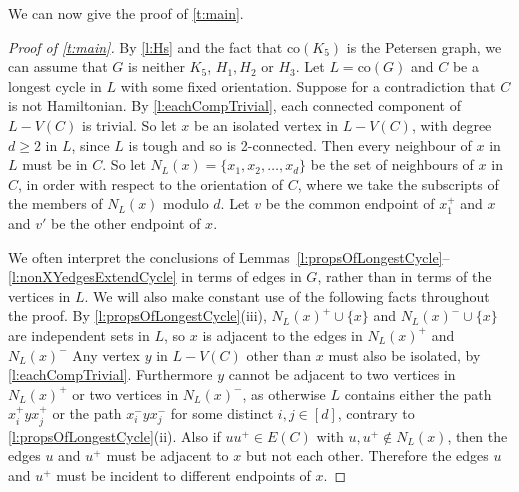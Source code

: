 \documentclass[12pt]{article}
\theoremstyle{definition}
\newcommand{\co}{\text{co}}
\begin{document}
\noindent We can now give the proof of \cref{t:main}.
\begin{proof}[Proof of \cref{t:main}]
By \cref{l:Hs} and the fact that $\co(K_5)$ is the Petersen graph, we can assume that $G$ is neither $K_5$, $H_1,H_2$ or $H_3$.
Let $L = \co(G)$ and  $C$ be a longest cycle in $L$ with some fixed orientation. Suppose for a contradiction that $C$ is not Hamiltonian.
By \cref{l:eachCompTrivial}, each connected component of $L-V(C)$ is trivial. 
So let $x$ be an isolated vertex in $L-V(C)$, with degree $d \geq 2$ in $L$, since $L$ is tough and so is 2-connected. Then every neighbour of $x$ in $L$ must be in $C$. So let $N_L(x) = \{x_1,x_2,\ldots, x_d\}$ be the set of neighbours of $x$ in $C$, in order with respect to the orientation of $C$, where 
we take the subscripts of the members of $N_L(x)$ modulo $d$.
Let $v$ be the common endpoint of $x_1^+$ and $x$ and $v'$ be the other endpoint of $x$.

We often interpret the conclusions of Lemmas~\ref{l:propsOfLongestCycle}--\ref{l:nonXYedgesExtendCycle} in terms of edges in $G$, rather than in terms of the vertices in $L$.
We will also make constant use of the following facts throughout the proof. 
By \cref{l:propsOfLongestCycle}(iii), $N_L(x)^+\cup \{x\}$ and $N_L(x)^-\cup \{x\}$ are independent sets in $L$, so $x$ is adjacent to the edges in $N_L(x)^+$ and $N_L(x)^-$
Any vertex $y$ in $L-V(C)$ other than $x$ must also be isolated, by \cref{l:eachCompTrivial}. 
Furthermore $y$ cannot be adjacent to two vertices in $N_L(x)^+$ or two vertices in $ N_L(x)^-$, as otherwise $L$ contains either the path $x_i^+ y x_j^+$ or the path $x_i^- y x_j^-$ for some distinct $i, j \in [d]$, contrary to \cref{l:propsOfLongestCycle}(ii).
Also if $uu^+ \in E(C)$ with $u,u^+ \notin N_L(x)$, then the edges $u$ and $u^+$ must be adjacent to $x$ but not each other. Therefore the edges $u$ and $u^+$ must be incident to different endpoints of $x$.


\end{proof}
\end{document}
